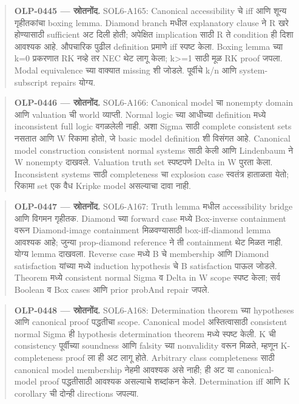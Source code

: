 \begin{quote}\small\textbf{OLP-0445 — स्रोतनोंद.} SOL6-A165: Canonical accessibility चे iff आणि शून्य गृहीतकांचा boxing lemma. Diamond branch मधील explanatory clause ने R खरे होण्यासाठी sufficient अट दिली होती; अपेक्षित implication साठी R ते condition ही दिशा आवश्यक आहे. औपचारिक पुढील definition प्रमाणे iff स्पष्ट केला. Boxing lemma च्या k=0 प्रकरणात RK नव्हे तर NEC थेट लागू केला; k>=1 साठी मूळ RK proof जपला. Modal equivalence च्या वाक्यात missing शी जोडले. पूर्वीचे k/n आणि system-subscript repairs योग्य.\end{quote}
\begin{quote}\small\textbf{OLP-0446 — स्रोतनोंद.} SOL6-A166: Canonical model चा nonempty domain आणि valuation ची world व्याप्ती. Normal logic च्या आधीच्या definition मध्ये inconsistent full logic वगळलेली नाही. अशा Sigma साठी complete consistent sets नसतात आणि W रिकामा होतो, जे basic model definition शी विसंगत आहे. Canonical model construction consistent normal systems साठी केली आणि Lindenbaum ने W nonempty दाखवले. Valuation truth set स्पष्टपणे Delta in W पुरता केला. Inconsistent systems साठी completeness चा explosion case स्वतंत्र हाताळता येतो; रिकामा set एक वैध Kripke model असल्याचा दावा नाही.\end{quote}
\begin{quote}\small\textbf{OLP-0447 — स्रोतनोंद.} SOL6-A167: Truth lemma मधील accessibility bridge आणि विगमन गृहीतक. Diamond च्या forward case मध्ये Box-inverse containment वरून Diamond-image containment मिळवण्यासाठी box-iff-diamond lemma आवश्यक आहे; जुन्या prop-diamond reference ने ती containment थेट मिळत नाही. योग्य lemma दाखवला. Reverse case मध्ये B चे membership आणि Diamond satisfaction यांच्या मध्ये induction hypothesis चे B satisfaction पाऊल जोडले. Theorem मध्ये consistent normal Sigma व Delta in W scope स्पष्ट केला; सर्व Boolean व Box cases आणि prior probAnd repair जपले.\end{quote}
\begin{quote}\small\textbf{OLP-0448 — स्रोतनोंद.} SOL6-A168: Determination theorem च्या hypotheses आणि canonical proof पद्धतीचा scope. Canonical model अस्तित्वासाठी consistent normal Sigma ही hypothesis determination theorem मध्ये स्पष्ट केली. K ची consistency पूर्वीच्या soundness आणि falsity च्या nonvalidity वरून मिळते, म्हणून K-completeness proof ला ही अट लागू होते. Arbitrary class completeness साठी canonical model membership नेहमी आवश्यक असे नाही; ही अट या canonical-model proof पद्धतीसाठी आवश्यक असल्याचे शब्दांकन केले. Determination iff आणि K corollary ची दोन्ही directions जपल्या.\end{quote}
